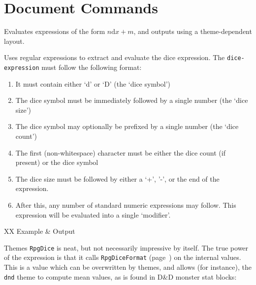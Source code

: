 	\section{Document Commands}

		\begin{macrolist}
				{
					Evaluates expressions of the form $n\mathrm{d}x + m$, and outputs using a theme-dependent layout.
				}
				{
				}{
					Uses regular expressions to extract and evaluate the dice expression. The \verb|dice-expression| must follow the following format:
					\begin{enumerate}
						\item It must contain either `d' or `D' (the `dice symbol')
						\item The dice symbol must be immediately followed by a single number (the `dice size')
						\item The dice symbol may optionally be prefixed by a single number (the `dice count')
						\item The first (non-whitespace) character must be either the dice count (if present) or the dice symbol
						\item The dice size must be followed by either a `+', '-', or the end of the expression.
						\item After this, any number of standard numeric expressions may follow. This expression will be evaluated into a single `modifier'.
					\end{enumerate} 
					\begin{RpgTable}{XX}
						Example & Output \\
					\end{RpgTable}
					\newline\vspace{1em}
					{\RpgFontSubsubsection{} Themes}
					\newline
					\verb|RpgDice| is neat, but not necessarily impressive by itself. The true power of the expression is that it calls \verb|RpgDiceFormat| (page~\pageref{Macro:DiceFormat}) on the internal values. This is a value which can be overwritten by themes, and allows (for instance), the \verb|dnd| theme to compute mean values, as is found in D\&D monster stat blocks:
					

}
\end{macrolist}
